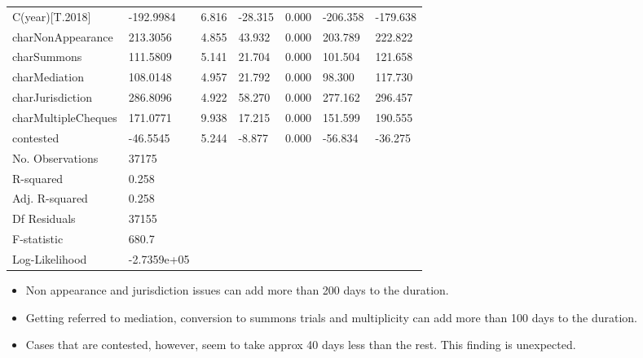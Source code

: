 \begin{longtable}{@{}lllllll@{}}
C(year)[T.2018] & -192.9984 & 6.816 & -28.315 & 0.000 & -206.358 & -179.638 \\
charNonAppearance & 213.3056 & 4.855 & 43.932 & 0.000 & 203.789 & 222.822 \\
charSummons & 111.5809 & 5.141 & 21.704 & 0.000 & 101.504 & 121.658 \\
charMediation & 108.0148 & 4.957 & 21.792 & 0.000 & 98.300 & 117.730 \\
charJurisdiction & 286.8096 & 4.922 & 58.270 & 0.000 & 277.162 & 296.457 \\
charMultipleCheques & 171.0771 & 9.938 & 17.215 & 0.000 & 151.599 & 190.555 \\
contested & -46.5545 & 5.244 & -8.877 & 0.000 & -56.834 & -36.275\\
\bottomrule
No. Observations & 37175 & & & & &\\
R-squared & 0.258 & & & & & \\
Adj. R-squared& 0.258& & & & & \\
Df Residuals& 37155 & & & & &\\
F-statistic & 680.7 & & & & & \\
Log-Likelihood & -2.7359e+05 & & & & & \\
\bottomrule
\end{longtable}

\begin{itemize}
\item Non appearance and jurisdiction issues can add more than 200
  days to the duration. 
\item Getting referred to mediation, conversion to
  summons trials and multiplicity can add more than 100 days to the
  duration. 
\item Cases that are contested, however, seem to take approx 40
  days less than the rest. This finding is unexpected.
\end{itemize}


